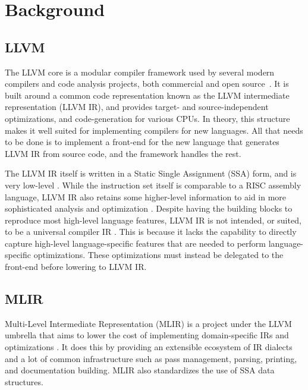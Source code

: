 \section{Background}

\subsection{LLVM}
The LLVM core is a modular compiler framework \cite{LLVM:CGO04, llvm_homepage} used by several modern compilers and code analysis projects, both commercial and open source~\cite{llvm_users}. It is built around a common code representation known as the LLVM intermediate representation (LLVM IR), and provides target- and source-independent optimizations, and code-generation for various CPUs. In theory, this structure makes it well suited for implementing compilers for new languages. All that needs to be done is to implement a front-end for the new language that generates LLVM IR from source code, and the framework handles the rest.

The LLVM IR itself is written in a Static Single Assignment (SSA) form, and is very low-level \cite{llvm_lang_ref, LLVM:CGO04}. While the instruction set itself is comparable to a RISC assembly language, LLVM IR also retains some higher-level information to aid in more sophisticated analysis and optimization \cite{llvm_lang_ref}. Despite having the building blocks to reproduce most high-level language features, LLVM IR is not intended, or suited, to be a universal compiler IR \cite{LLVM:CGO04}. This is because it lacks the capability to directly capture high-level language-specific features that are needed to perform language-specific optimizations. These optimizations must instead be delegated to the front-end before lowering to LLVM IR.


\subsection{MLIR}
Multi-Level Intermediate Representation (MLIR) is a project under the LLVM umbrella \cite{llvm_homepage} that aims to lower the cost of implementing domain-specific IRs  and optimizations \cite{mlir}. It does this by providing an extensible ecosystem of IR dialects and a lot of common infrastructure such as pass management, parsing, printing, and documentation building. MLIR also standardizes the use of SSA data structures.

